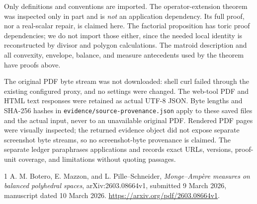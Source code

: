 \documentclass[11pt]{article}
\begin{document}
Only definitions and conventions are imported. The operator-extension theorem was inspected only in part and is \emph{not} an application dependency. Its full proof, nor a real-scalar repair, is claimed here. The factorial proposition has toric proof dependencies; we do not import those either, since the needed local identity is reconstructed by divisor and polygon calculations. The matroid description and all convexity, envelope, balance, and measure antecedents used by the theorem have proofs above.

The original PDF byte stream was not downloaded: shell curl failed through the existing configured proxy, and no settings were changed. The web-tool PDF and HTML text responses were retained as actual UTF-8 JSON. Byte lengths and SHA-256 hashes in \nolinkurl{evidence/source-provenance.json} apply to these saved files and the actual input, never to an unavailable original PDF. Rendered PDF pages were visually inspected; the returned evidence object did not expose separate screenshot byte streams, so no screenshot-byte provenance is claimed. The separate ledger paraphrases applications and records exact URLs, versions, proof-unit coverage, and limitations without quoting passages.

\begin{thebibliography}{1}
 A. M. Botero, E. Mazzon, and L. Pille--Schneider,
\emph{Monge--Amp\`ere measures on balanced polyhedral spaces},
arXiv:2603.08664v1, submitted 9 March 2026, manuscript dated 10 March 2026.
\url{https://arxiv.org/pdf/2603.08664v1}.
\end{thebibliography}
\end{document}
